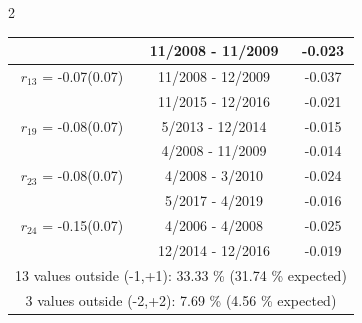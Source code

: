 \begin{multicols}{2}
{\begin{tabular}{ccc}
  &       11/2008 - 11/2009 &       -0.023  \vspace{-.02in}   \\ \hline 
    $r_{13}$ = -0.07(0.07) &      11/2008 - 12/2009 &       -0.037    \vspace{-.10in} \\ 
  &       11/2015 - 12/2016 &       -0.021  \vspace{-.02in}   \\ \hline 
    $r_{19}$ = -0.08(0.07) &       5/2013 - 12/2014 &       -0.015    \vspace{-.10in} \\ 
  &        4/2008 - 11/2009 &       -0.014  \vspace{-.02in}   \\ \hline 
    $r_{23}$ = -0.08(0.07) &       4/2008 -  3/2010 &       -0.024    \vspace{-.10in} \\ 
  &        5/2017 -  4/2019 &       -0.016  \vspace{-.02in}   \\ \hline 
    $r_{24}$ = -0.15(0.07) &       4/2006 -  4/2008 &       -0.025    \vspace{-.10in} \\ 
  &       12/2014 - 12/2016 &       -0.019  \vspace{-.02in}   \\ \hline 
  \multicolumn{3}{c}{              13 values outside (-1,+1): 33.33  \% (31.74  \% expected)}\vspace{-.10in} \\ 
\multicolumn{3}{c}{               3 values outside (-2,+2):  7.69 \%  (4.56 \% expected) } \\
 \end{tabular} \\ 
 } 
\end{multicols} 
